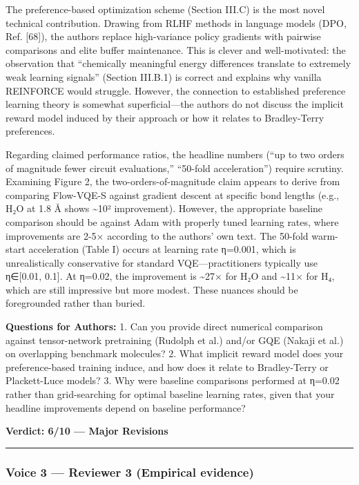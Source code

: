 \documentclass[10pt,letterpaper]{article}
\begin{document}
The preference-based optimization scheme (Section III.C) is the most novel technical contribution. Drawing from RLHF methods in language models (DPO, Ref. {[}68{]}), the authors replace high-variance policy gradients with pairwise comparisons and elite buffer maintenance. This is clever and well-motivated: the observation that ``chemically meaningful energy differences translate to extremely weak learning signals'' (Section III.B.1) is correct and explains why vanilla REINFORCE would struggle. However, the connection to established preference learning theory is somewhat superficial---the authors do not discuss the implicit reward model induced by their approach or how it relates to Bradley-Terry preferences.

Regarding claimed performance ratios, the headline numbers (``up to two orders of magnitude fewer circuit evaluations,'' ``50-fold acceleration'') require scrutiny. Examining Figure 2, the two-orders-of-magnitude claim appears to derive from comparing Flow-VQE-S against gradient descent at specific bond lengths (e.g., H₂O at 1.8 Å shows \textasciitilde10² improvement). However, the appropriate baseline comparison should be against Adam with properly tuned learning rates, where improvements are 2-5× according to the authors' own text. The 50-fold warm-start acceleration (Table I) occurs at learning rate η=0.001, which is unrealistically conservative for standard VQE---practitioners typically use η∈{[}0.01, 0.1{]}. At η=0.02, the improvement is \textasciitilde27× for H₂O and \textasciitilde11× for H₄, which are still impressive but more modest. These nuances should be foregrounded rather than buried.

\textbf{Questions for Authors:}
1. Can you provide direct numerical comparison against tensor-network pretraining (Rudolph et al.) and/or GQE (Nakaji et al.) on overlapping benchmark molecules?
2. What implicit reward model does your preference-based training induce, and how does it relate to Bradley-Terry or Plackett-Luce models?
3. Why were baseline comparisons performed at η=0.02 rather than grid-searching for optimal baseline learning rates, given that your headline improvements depend on baseline performance?

\textbf{Verdict: 6/10 --- Major Revisions}

\begin{center}\rule{0.5\linewidth}{0.5pt}\end{center}

\hypertarget{voice-3-reviewer-3-empirical-evidence}{%
\subsubsection{Voice 3 --- Reviewer 3 (Empirical evidence)}\label{voice-3-reviewer-3-empirical-evidence}}
\end{document}
